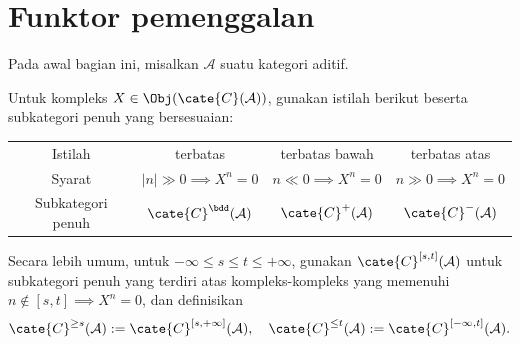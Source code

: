 
\section{Funktor pemenggalan}\label{sec:truncation-functors}
\hypertarget{o014.aljabr2.chapter3.truncation-functors}{ }

Pada awal bagian ini, misalkan $\mathcal{A}$ suatu kategori aditif.

\begin{definisi}\label{def:cplx-cat-variant}
	Untuk kompleks $X \in \Obj(\cate{C}(\mathcal{A}))$, gunakan istilah
	berikut beserta subkategori penuh yang bersesuaian:
	\begin{center}\small\setlength{\tabcolsep}{3pt}\begin{tabular}{|c|c|c|c|}\hline
		Istilah & terbatas & terbatas bawah & terbatas atas \\
		Syarat & $|n| \gg 0 \implies X^n = 0 $ & $n \ll 0 \implies X^n = 0$ & $n \gg 0 \implies X^n = 0$ \\
		Subkategori penuh & $\cate{C}^{\bdd}(\mathcal{A})$ & $\cate{C}^+(\mathcal{A})$ & $\cate{C}^-(\mathcal{A})$ \\ \hline
	\end{tabular}\end{center}
	
	Secara lebih umum, untuk $-\infty \leq s \leq t \leq +\infty$,
	gunakan $\cate{C}^{[s,t]}(\mathcal{A})$ untuk subkategori penuh yang
	terdiri atas kompleks-kompleks yang memenuhi
	$n \notin [s, t] \implies X^n = 0$, dan definisikan
	\[ \cate{C}^{\geq s}(\mathcal{A}) := \cate{C}^{[s, +\infty]}(\mathcal{A}), \quad \cate{C}^{\leq t}(\mathcal{A}) := \cate{C}^{[-\infty, t]}(\mathcal{A}). \]
\end{definisi}

